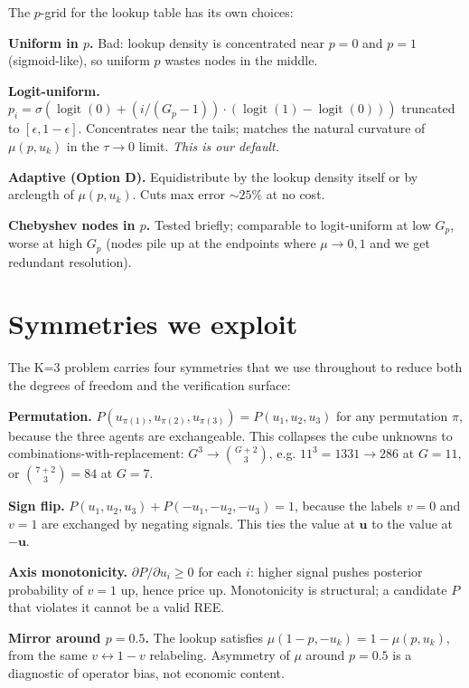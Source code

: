 \documentclass[11pt]{article}
\begin{document}
The $p$-grid for the lookup table has its own choices:

\textbf{Uniform in $p$.} Bad: lookup density is concentrated near
$p = 0$ and $p = 1$ (sigmoid-like), so uniform $p$ wastes nodes in
the middle.

\textbf{Logit-uniform.} $p_i = \sigma(\operatorname{logit}(0) +
(i / (G_p - 1)) \cdot (\operatorname{logit}(1) - \operatorname{logit}(0)))$
truncated to $[\epsilon, 1 - \epsilon]$. Concentrates near the tails;
matches the natural curvature of $\mu(p, u_k)$ in the $\tau \to 0$ limit.
\emph{This is our default.}

\textbf{Adaptive (Option D).} Equidistribute by the lookup density itself
or by arclength of $\mu(p, u_k)$. Cuts max error $\sim 25\%$ at no cost.

\textbf{Chebyshev nodes in $p$.} Tested briefly; comparable to
logit-uniform at low $G_p$, worse at high $G_p$ (nodes pile up at the
endpoints where $\mu \to 0, 1$ and we get redundant resolution).

\section{Symmetries we exploit}

The K=3 problem carries four symmetries that we use throughout to
reduce both the degrees of freedom and the verification surface:

\textbf{Permutation.} $P(u_{\pi(1)}, u_{\pi(2)}, u_{\pi(3)}) = P(u_1, u_2, u_3)$
for any permutation $\pi$, because the three agents are exchangeable.
This collapses the cube unknowns to combinations-with-replacement:
$G^3 \to \binom{G+2}{3}$, e.g. $11^3 = 1331 \to 286$ at $G=11$, or
$\binom{7+2}{3} = 84$ at $G=7$.

\textbf{Sign flip.} $P(u_1, u_2, u_3) + P(-u_1, -u_2, -u_3) = 1$, because
the labels $v = 0$ and $v = 1$ are exchanged by negating signals. This
ties the value at $\mathbf{u}$ to the value at $-\mathbf{u}$.

\textbf{Axis monotonicity.} $\partial P / \partial u_i \ge 0$ for each $i$:
higher signal pushes posterior probability of $v=1$ up, hence price
up. Monotonicity is structural; a candidate $P$ that violates it
cannot be a valid REE.

\textbf{Mirror around $p = 0.5$.} The lookup satisfies
$\mu(1 - p, -u_k) = 1 - \mu(p, u_k)$, from the same $v \leftrightarrow 1-v$
relabeling. Asymmetry of $\mu$ around $p = 0.5$ is a diagnostic of
operator bias, not economic content.
\end{document}
